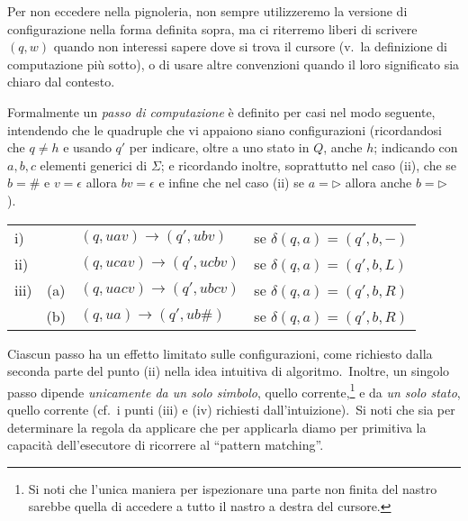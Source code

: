 \noindent Per non eccedere nella pignoleria, non sempre utilizzeremo la versione di configurazione nella forma definita sopra, ma ci riterremo liberi di scrivere $(q,w)$ quando non interessi sapere dove si trova il cursore (v.\ la definizione di computazione più sotto), o di usare altre convenzioni quando il loro significato sia chiaro dal contesto.

\vspace{12pt}

\noindent Formalmente un \textit{passo di computazione} è definito per casi nel modo seguente, intendendo che le quadruple che vi appaiono siano configurazioni (ricordandosi che $q \neq h$ e usando $q'$ per indicare, oltre a uno stato in $Q$, anche $h$; indicando con $a,b,c$ elementi generici di $\Sigma$; e ricordando inoltre, soprattutto nel caso (ii), che se $b = \#$ e $ v = \epsilon$ allora $bv = \epsilon$ e infine che nel caso (ii) se $a = \triangleright$ allora anche $b= \triangleright$).\

\begin{table}[H]
    \centering
    \begin{tabular}{l c l l}
        i)   &     & $(q, uav) \rightarrow (q', ubv)$    & se $\delta(q, a)=(q', b, -)$ \\
        ii)  &     & $(q, ucav) \rightarrow (q', ucbv)$  & se $\delta(q, a)=(q', b, L)$ \\
        iii) & (a) & $(q, uacv) \rightarrow (q' , ubcv)$ & se $\delta(q, a)=(q', b, R)$ \\
             & (b) & $(q, ua) \rightarrow (q', ub\#)$    & se $\delta(q, a)=(q', b, R)$ \\
    \end{tabular}
\end{table}

\noindent Ciascun passo ha un effetto limitato sulle configurazioni, come richiesto dalla seconda parte del punto (ii) nella idea intuitiva di algoritmo.\
Inoltre, un singolo passo dipende \textit{unicamente da un solo simbolo}, quello corrente,\footnote{Si noti che l'unica maniera per ispezionare una parte non finita del nastro sarebbe quella di accedere a tutto il nastro a destra del cursore.} e da \textit{un solo stato}, quello corrente (cf.\ i punti (iii) e (iv) richiesti dall'intuizione).\
Si noti che sia per determinare la regola da applicare che per applicarla diamo per primitiva la capacità dell'esecutore di ricorrere al ``pattern matching''.

\medskip

